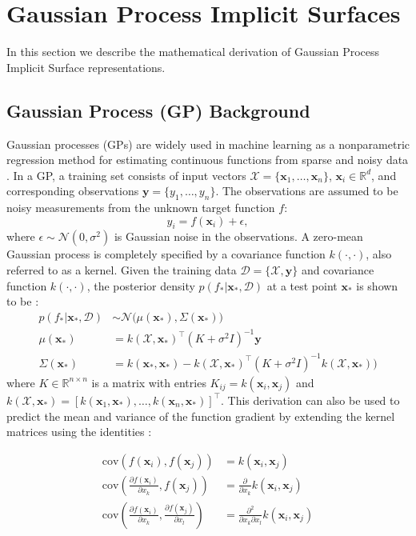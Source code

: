 \documentclass[letterpaper, 10 pt, conference]{ieeeconf}  %
\newcommand{\by}{\mathbf{y}}
\newcommand{\bx}{\mathbf{x}}
\newcommand{\mX}{\mathcal{X}}
\newcommand{\mD}{\mathcal{D}}
\newcommand{\mN}{\mathcal{N}}
\begin{document}
\section{Gaussian Process Implicit Surfaces}

In this section we describe the mathematical derivation of Gaussian Process Implicit Surface representations.

\subsection{Gaussian Process (GP) Background}

Gaussian processes (GPs) are widely used in machine learning as a nonparametric regression method for estimating continuous functions from sparse and noisy data \cite{rasmussen2006gaussian}.
In a GP, a training set consists of input vectors $\mX = \{\bx_1, \ldots, \bx_n\}$, $\bx_i \in \mathbb{R}^d$, and corresponding observations $\by = \{y_1, \ldots, y_n\}$. The observations are assumed to be noisy measurements from the unknown target function $f$:
\begin{equation}
y_i = f(\bx_i) + \epsilon,
\end{equation}
where $\epsilon \sim \mN(0,\sigma^2)$ is Gaussian noise in the observations.
A zero-mean Gaussian process is completely specified by a covariance function $k(\cdot,\cdot)$, also referred to as a kernel.
Given the training data $\mD = \{\mX, \by\}$ and covariance function $k(\cdot,\cdot)$, the posterior density $p(f_*|\bx_*,\mD)$ at a test point $\bx_{*}$ is shown to be \cite{rasmussen2006gaussian}:
\begin{align}
	p(f_*|\bx_*,\mD) &\sim \mN\big(\mu(\bx_*), \Sigma(\bx_*)\big) \label{eq:GPposterior} \\
	\mu(\bx_*) &= k(\mX,\bx_*)^{\intercal}(K + \sigma^2I)^{-1}\by \label{eq:GPmean} \\
	\Sigma(\bx_*) &= k(\bx_*,\bx_*)-k(\mX,\bx_*)^{\intercal}(K+\sigma^2I)^{-1}k(\mX,\bx_*)\big) \label{eq:GPvar}
\end{align}
where $K \in \mathbb{R}^{n \times n}$ is a matrix with entries $K_{ij} = k(\bx_i,\bx_j)$ and $k(\mX,\bx_*) = [k(\bx_1,\bx_*),\ldots,k(\bx_n,\bx_*)]^{\intercal}$. 
This derivation can also be used to predict the mean and variance of the function gradient by extending the kernel matrices using the identities \cite{solak2003derivative}:

\begin{align*}
	\text{cov}\left(f(\bx_i), f(\bx_j) \right) &=  k(\bx_i, \bx_j) \\
	\text{cov}\left(\frac{\partial f (\bx_i)}{\partial x_k}, f(\bx_j) \right) &= \frac{\partial}{\partial x_k} k(\bx_i, \bx_j) \\
	\text{cov}\left(\frac{\partial f (\bx_i)}{\partial x_k}, \frac{\partial f (\bx_j)}{\partial x_l} \right) &= \frac{\partial^2}{\partial x_k \partial x_l} k(\bx_i, \bx_j)
\end{align*}
\end{document}
